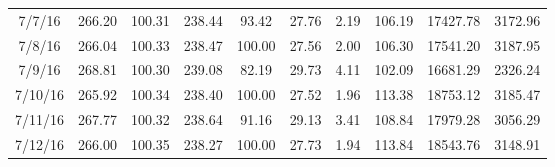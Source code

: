 \documentclass[12pt,a4paper]{report}
\begin{document}
\begin{longtable}[c]{| c | c | c |c |c |c |c |c |c |c |}
7/7/16        & 266.20       & 100.31       & 238.44      & 93.42           & 27.76        & 2.19         & 106.19       & 17427.78     & 3172.96      \\
7/8/16        & 266.04       & 100.33       & 238.47      & 100.00          & 27.56        & 2.00         & 106.30       & 17541.20     & 3187.95      \\
7/9/16        & 268.81       & 100.30       & 239.08      & 82.19           & 29.73        & 4.11         & 102.09       & 16681.29     & 2326.24      \\
7/10/16       & 265.92       & 100.34       & 238.40      & 100.00          & 27.52        & 1.96         & 113.38       & 18753.12     & 3185.47      \\
7/11/16       & 267.77       & 100.32       & 238.64      & 91.16           & 29.13        & 3.41         & 108.84       & 17979.28     & 3056.29      \\
7/12/16       & 266.00       & 100.35       & 238.27      & 100.00          & 27.73        & 1.94         & 113.84       & 18543.76     & 3148.91      \\\bottomrule
 \end{longtable}


\end{document}
